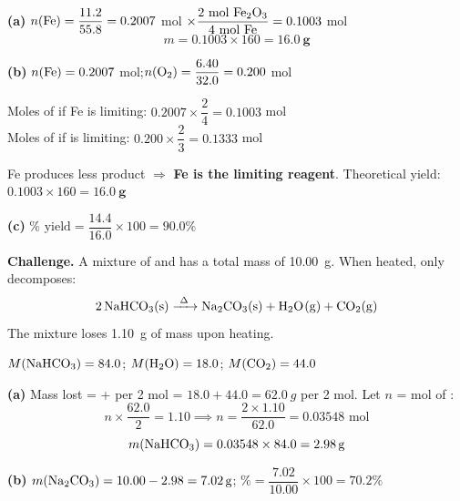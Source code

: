 \documentclass[addpoints]{exam}
\begin{document}
\begin{questions}
\begin{solution}[10cm]
\textbf{(a)} $n(\ce{Fe}) = \dfrac{11.2}{55.8} = 0.2007$ mol\quad
$\times\dfrac{2\text{ mol \ce{Fe2O3}}}{4\text{ mol Fe}} = 0.1003$ mol 
\[
m = 0.1003 \times 160 = \mathbf{\SI{16.0}{g}}
\]

\textbf{(b)} $n(\ce{Fe}) = 0.2007$ mol;\quad $n(\ce{O2}) = \dfrac{6.40}{32.0} = 0.200$ mol

Moles of  if Fe is limiting: $0.2007 \times \dfrac{2}{4} = 0.1003$ mol\\
Moles of  if  is limiting: $0.200 \times \dfrac{2}{3} = 0.1333$ mol

Fe produces less product $\Rightarrow$ \textbf{Fe is the limiting reagent}.
Theoretical yield: $0.1003 \times 160 = \mathbf{\SI{16.0}{g}}$

\textbf{(c)} $\%\text{ yield} = \dfrac{14.4}{16.0} \times 100 = \mathbf{90.0\%}$
\end{solution}

\question \textbf{Challenge.} A mixture of  and  has a total mass of
\SI{10.00}{g}. When heated, only  decomposes:
\[\ce{2NaHCO3(s) ->[\Delta] Na2CO3(s) + H2O(g) + CO2(g)}\]
The mixture loses \SI{1.10}{g} of mass upon heating.
\begin{solution}[9cm]
$M(\ce{NaHCO3}) = 84.0$;\; $M(\ce{H2O}) = 18.0$;\; $M(\ce{CO2}) = 44.0$

\textbf{(a)} Mass lost =  +  per 2 mol  = $18.0 + 44.0 = \SI{62.0}{g}$ per 2 mol.
Let $n$ = mol of :
\[
n \times \frac{62.0}{2} = 1.10 \implies n = \frac{2 \times 1.10}{62.0} = 0.03548 \text{ mol}
\]
\[
m(\ce{NaHCO3}) = 0.03548 \times 84.0 = \mathbf{\SI{2.98}{g}}
\]

\textbf{(b)} $m(\ce{Na2CO3}) = 10.00 - 2.98 = \SI{7.02}{g}$;\quad
$\% = \dfrac{7.02}{10.00}\times100 = \mathbf{70.2\%}$
\end{solution}

\end{questions}
\end{document}
